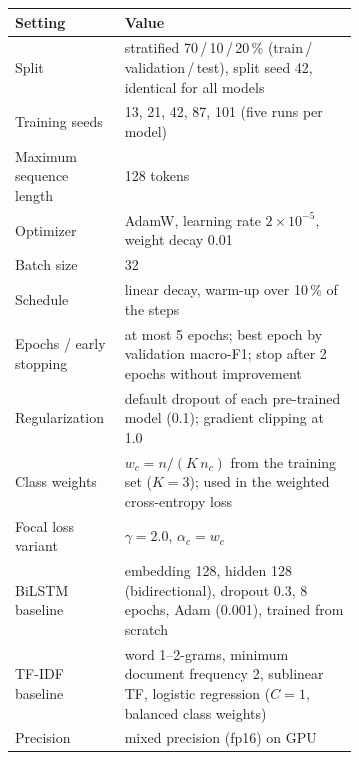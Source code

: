 \begin{tabular}{@{}lp{0.68\linewidth}@{}}
\toprule
Setting & Value \\
\midrule
Split & stratified 70\,/\,10\,/\,20\,\% (train\,/\,validation\,/\,test), split seed 42, identical for all models \\
Training seeds & 13, 21, 42, 87, 101 (five runs per model) \\
Maximum sequence length & 128 tokens \\
Optimizer & AdamW, learning rate $2\times10^{-5}$, weight decay 0.01 \\
Batch size & 32 \\
Schedule & linear decay, warm-up over 10\,\% of the steps \\
Epochs / early stopping & at most 5 epochs; best epoch by validation macro-F1; stop after 2 epochs without improvement \\
Regularization & default dropout of each pre-trained model (0.1); gradient clipping at 1.0 \\
Class weights & $w_c = n / (K\,n_c)$ from the training set ($K=3$); used in the weighted cross-entropy loss \\
Focal loss variant & $\gamma = 2.0$, $\alpha_c = w_c$ \\
BiLSTM baseline & embedding 128, hidden 128 (bidirectional), dropout 0.3, 8 epochs, Adam (0.001), trained from scratch \\
TF-IDF baseline & word 1--2-grams, minimum document frequency 2, sublinear TF, logistic regression ($C=1$, balanced class weights) \\
Precision & mixed precision (fp16) on GPU \\
\bottomrule
\end{tabular}
